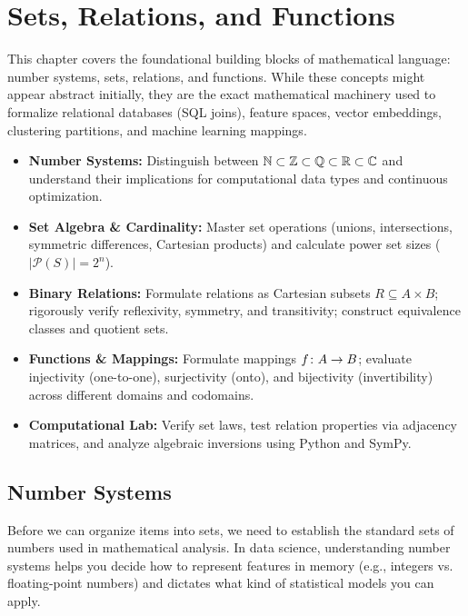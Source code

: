 \chapter{Sets, Relations, and Functions}

This chapter covers the foundational building blocks of mathematical language: number systems, sets, relations, and functions. While these concepts might appear abstract initially, they are the exact mathematical machinery used to formalize relational databases (SQL joins), feature spaces, vector embeddings, clustering partitions, and machine learning mappings.

\vspace{0.3cm}
\begin{tcolorbox}[colback=primarylight, colframe=primarydark, title={\textbf{Executive Roadmap \& Learning Objectives}}]
\begin{itemize}
    \item \textbf{Number Systems:} Distinguish between $\mathbb{N} \subset \mathbb{Z} \subset \mathbb{Q} \subset \mathbb{R} \subset \mathbb{C}$ and understand their implications for computational data types and continuous optimization.
    \item \textbf{Set Algebra \& Cardinality:} Master set operations (unions, intersections, symmetric differences, Cartesian products) and calculate power set sizes ($|\mathcal{P}(S)| = 2^n$).
    \item \textbf{Binary Relations:} Formulate relations as Cartesian subsets $R \subseteq A \times B$; rigorously verify reflexivity, symmetry, and transitivity; construct equivalence classes and quotient sets.
    \item \textbf{Functions \& Mappings:} Formulate mappings $f \colon A \to B$; evaluate injectivity (one-to-one), surjectivity (onto), and bijectivity (invertibility) across different domains and codomains.
    \item \textbf{Computational Lab:} Verify set laws, test relation properties via adjacency matrices, and analyze algebraic inversions using Python and SymPy.
\end{itemize}
\end{tcolorbox}
\vspace{0.3cm}

\section{Number Systems}

Before we can organize items into sets, we need to establish the standard sets of numbers used in mathematical analysis. In data science, understanding number systems helps you decide how to represent features in memory (e.g., integers vs. floating-point numbers) and dictates what kind of statistical models you can apply.

